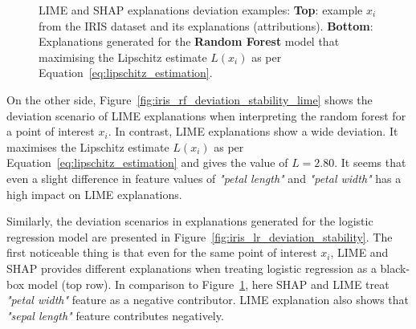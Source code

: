 \documentclass[english]{tktltiki2}
\theoremstyle{definition}
\theoremstyle{remark}
\begin{document}
\begin{figure}[H]
	\hspace*{\fill}%
	\caption{LIME and SHAP explanations deviation examples: \textbf{Top}: example $x_i$ from the IRIS dataset and its explanations (attributions). \textbf{Bottom}: Explanations generated for the \textbf{Random Forest} model that maximising the Lipschitz estimate $L(x_i)$ as per Equation~\eqref{eq:lipschitz_estimation}.}%
	\label{fig:iris_rf_deviation_stability}%
\end{figure}

On the other side, Figure~\ref{fig:iris_rf_deviation_stability_lime} shows the deviation scenario of LIME explanations when interpreting the random forest for a point of interest $x_i$. In contrast, LIME explanations show a wide deviation. It maximises the Lipschitz estimate $L(x_i)$ as per Equation~\eqref{eq:lipschitz_estimation} and gives the value of $L=2.80$. It seems that even a slight difference in feature values of \textit{"petal length"} and \textit{"petal width"} has a high impact on LIME explanations.


Similarly, the deviation scenarios in explanations generated for the logistic regression model are presented in Figure~\ref{fig:iris_lr_deviation_stability}. The first noticeable thing is that even for the same point of interest $x_i$, LIME and SHAP provides different explanations when treating logistic regression as a black-box model (top row). In comparison to Figure~\ref{fig:iris_rf_deviation_stability}, here SHAP and LIME treat \textit{"petal width"} feature as a negative contributor. LIME explanation also shows that \textit{"sepal length"} feature contributes negatively.
\end{document}
